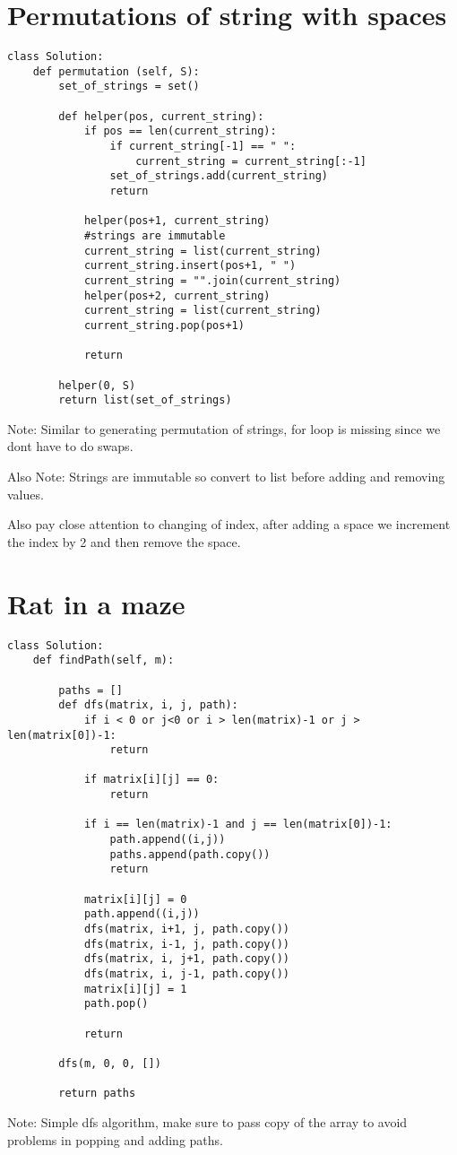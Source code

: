 \documentclass[a4]{article}
\begin{document}
\section{Permutations of string with spaces}
\begin{lstlisting}
class Solution:
    def permutation (self, S):        
        set_of_strings = set()

        def helper(pos, current_string):
            if pos == len(current_string):
                if current_string[-1] == " ":
                    current_string = current_string[:-1]
                set_of_strings.add(current_string)
                return

            helper(pos+1, current_string)
            #strings are immutable
            current_string = list(current_string)
            current_string.insert(pos+1, " ")
            current_string = "".join(current_string)
            helper(pos+2, current_string)
            current_string = list(current_string)
            current_string.pop(pos+1)

            return

        helper(0, S)
        return list(set_of_strings)
\end{lstlisting}
Note: Similar to generating permutation of strings, for loop is missing since we dont have to do swaps.

Also Note: Strings are immutable so convert to list before adding and removing values.

Also pay close attention to changing of index, after adding a space we increment the index by 2 and then remove the space.

\newpage
\section{Rat in a maze}
\begin{lstlisting}
class Solution:
    def findPath(self, m):
        
        paths = []
        def dfs(matrix, i, j, path):
            if i < 0 or j<0 or i > len(matrix)-1 or j > len(matrix[0])-1:
                return

            if matrix[i][j] == 0:
                return

            if i == len(matrix)-1 and j == len(matrix[0])-1:
                path.append((i,j))
                paths.append(path.copy())
                return

            matrix[i][j] = 0
            path.append((i,j))
            dfs(matrix, i+1, j, path.copy())
            dfs(matrix, i-1, j, path.copy())
            dfs(matrix, i, j+1, path.copy())
            dfs(matrix, i, j-1, path.copy())
            matrix[i][j] = 1
            path.pop()

            return

        dfs(m, 0, 0, [])

        return paths
\end{lstlisting}
Note: Simple dfs algorithm, make sure to pass copy of the array to avoid problems in popping and adding paths.
\end{document}
